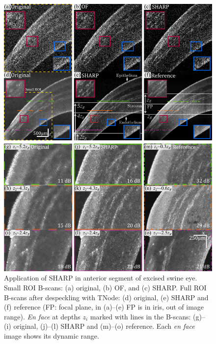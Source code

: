 \begin{figure}[htb!]
	\centering
	\includegraphics[width=\textwidth]{Figures/Results/ASImaging.pdf}
	\caption[Application of SHARP in anterior segment of excised swine eye.]{Application of SHARP in anterior segment of excised swine eye. Small ROI B-scans: (a) original, (b) OF, and (c) SHARP. Full ROI B-scans after despeckling with TNode: (d) original, (e) SHARP and (f) reference (FP: focal plane, in (a)--(e) FP is in iris, out of image range). \textit{En face} at depths $z_i$ marked with lines in the B-scans: (g)--(i) original, (j)--(l) SHARP and (m)--(o) reference. Each \textit{en face} image shows its dynamic range.}
	\label{fig:ASImaging}
\end{figure}

